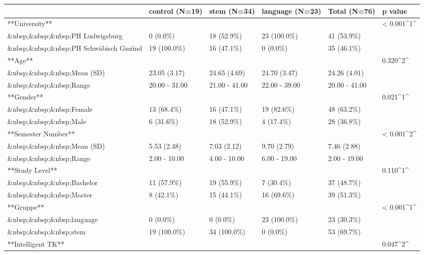 \documentclass[
  letterpaper,
  DIV=11,
  numbers=noendperiod]{scrartcl}
\begin{document}
\begin{table}
{\begin{tabular}{llllll}
\toprule
 & control (N=19) & stem (N=34) & language (N=23) & Total (N=76) & p value\\
\midrule
**University** &  &  &  &  & < 0.001\textasciicircum{}1\textasciicircum{}\\
\&nbsp;\&nbsp;\&nbsp;PH Ludwigsburg & 0 (0.0\%) & 18 (52.9\%) & 23 (100.0\%) & 41 (53.9\%) & \\
\&nbsp;\&nbsp;\&nbsp;PH Schwäbisch Gmünd & 19 (100.0\%) & 16 (47.1\%) & 0 (0.0\%) & 35 (46.1\%) & \\
**Age** &  &  &  &  & 0.320\textasciicircum{}2\textasciicircum{}\\
\&nbsp;\&nbsp;\&nbsp;Mean (SD) & 23.05 (3.17) & 24.65 (4.69) & 24.70 (3.47) & 24.26 (4.01) & \\
\addlinespace
\&nbsp;\&nbsp;\&nbsp;Range & 20.00 - 31.00 & 21.00 - 41.00 & 22.00 - 39.00 & 20.00 - 41.00 & \\
**Gender** &  &  &  &  & 0.021\textasciicircum{}1\textasciicircum{}\\
\&nbsp;\&nbsp;\&nbsp;Female & 13 (68.4\%) & 16 (47.1\%) & 19 (82.6\%) & 48 (63.2\%) & \\
\&nbsp;\&nbsp;\&nbsp;Male & 6 (31.6\%) & 18 (52.9\%) & 4 (17.4\%) & 28 (36.8\%) & \\
**Semester Number** &  &  &  &  & < 0.001\textasciicircum{}2\textasciicircum{}\\
\addlinespace
\&nbsp;\&nbsp;\&nbsp;Mean (SD) & 5.53 (2.48) & 7.03 (2.12) & 9.70 (2.79) & 7.46 (2.88) & \\
\&nbsp;\&nbsp;\&nbsp;Range & 2.00 - 10.00 & 4.00 - 10.00 & 6.00 - 19.00 & 2.00 - 19.00 & \\
**Study Level** &  &  &  &  & 0.110\textasciicircum{}1\textasciicircum{}\\
\&nbsp;\&nbsp;\&nbsp;Bachelor & 11 (57.9\%) & 19 (55.9\%) & 7 (30.4\%) & 37 (48.7\%) & \\
\&nbsp;\&nbsp;\&nbsp;Master & 8 (42.1\%) & 15 (44.1\%) & 16 (69.6\%) & 39 (51.3\%) & \\
\addlinespace
**Gruppe** &  &  &  &  & < 0.001\textasciicircum{}1\textasciicircum{}\\
\&nbsp;\&nbsp;\&nbsp;language & 0 (0.0\%) & 0 (0.0\%) & 23 (100.0\%) & 23 (30.3\%) & \\
\&nbsp;\&nbsp;\&nbsp;stem & 19 (100.0\%) & 34 (100.0\%) & 0 (0.0\%) & 53 (69.7\%) & \\
**Intelligent TK** &  &  &  &  & 0.047\textasciicircum{}2\textasciicircum{}\\

\end{tabular}}
\end{table}
\end{document}
